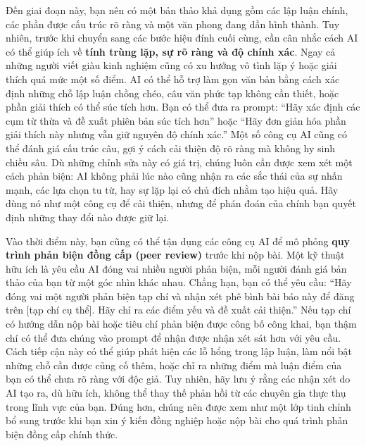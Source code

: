 Đến giai đoạn này, bạn nên có một bản thảo khả dụng gồm các lập luận chính, các phần được cấu trúc rõ ràng và một văn phong đang dần hình thành. Tuy nhiên, trước khi chuyển sang các bước hiệu đính cuối cùng, cần cân nhắc cách AI có thể giúp ích về \textbf{tính trùng lặp, sự rõ ràng và độ chính xác}. Ngay cả những người viết giàu kinh nghiệm cũng có xu hướng vô tình lặp ý hoặc giải thích quá mức một số điểm. AI có thể hỗ trợ làm gọn văn bản bằng cách xác định những chỗ lập luận chồng chéo, câu văn phức tạp không cần thiết, hoặc phần giải thích có thể súc tích hơn. Bạn có thể đưa ra prompt: ``Hãy xác định các cụm từ thừa và đề xuất phiên bản súc tích hơn'' hoặc ``Hãy đơn giản hóa phần giải thích này nhưng vẫn giữ nguyên độ chính xác.'' Một số công cụ AI cũng có thể đánh giá cấu trúc câu, gợi ý cách cải thiện độ rõ ràng mà không hy sinh chiều sâu. Dù những chỉnh sửa này có giá trị, chúng luôn cần được xem xét một cách phản biện: AI không phải lúc nào cũng nhận ra các sắc thái của sự nhấn mạnh, các lựa chọn tu từ, hay sự lặp lại có chủ đích nhằm tạo hiệu quả. Hãy dùng nó như một công cụ để cải thiện, nhưng để phán đoán của chính bạn quyết định những thay đổi nào được giữ lại.

Vào thời điểm này, bạn cũng có thể tận dụng các công cụ AI để mô phỏng \textbf{quy trình phản biện đồng cấp (peer review)} trước khi nộp bài. Một kỹ thuật hữu ích là yêu cầu AI đóng vai nhiều người phản biện, mỗi người đánh giá bản thảo của bạn từ một góc nhìn khác nhau. Chẳng hạn, bạn có thể yêu cầu: ``Hãy đóng vai một người phản biện tạp chí và nhận xét phê bình bài báo này để đăng trên {[}tạp chí cụ thể{]}. Hãy chỉ ra các điểm yếu và đề xuất cải thiện.'' Nếu tạp chí có hướng dẫn nộp bài hoặc tiêu chí phản biện được công bố công khai, bạn thậm chí có thể đưa chúng vào prompt để nhận được nhận xét sát hơn với yêu cầu. Cách tiếp cận này có thể giúp phát hiện các lỗ hổng trong lập luận, làm nổi bật những chỗ cần được củng cố thêm, hoặc chỉ ra những điểm mà luận điểm của bạn có thể chưa rõ ràng với độc giả. Tuy nhiên, hãy lưu ý rằng các nhận xét do AI tạo ra, dù hữu ích, không thể thay thế phản hồi từ các chuyên gia thực thụ trong lĩnh vực của bạn. Đúng hơn, chúng nên được xem như một lớp tinh chỉnh bổ sung trước khi bạn xin ý kiến đồng nghiệp hoặc nộp bài cho quá trình phản biện đồng cấp chính thức.

